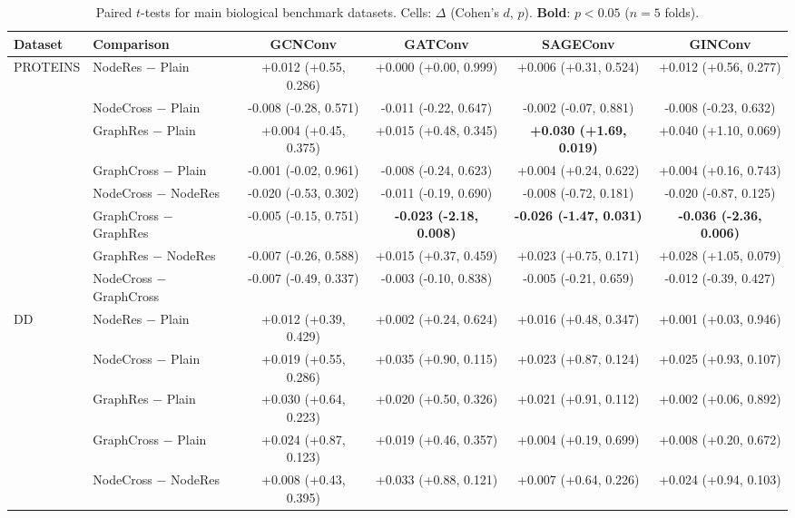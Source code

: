 \begin{table}[t]
\centering
\scriptsize
\setlength{\tabcolsep}{3pt}
\caption{Paired $t$-tests for main biological benchmark datasets. Cells: $\Delta$ (Cohen's $d$, $p$). \textbf{Bold}: $p<0.05$ ($n{=}5$ folds).}
\label{tab:statistical_tests_main}
\begin{tabular}{llcccc}
\toprule
Dataset & Comparison & GCNConv & GATConv & SAGEConv & GINConv \\
\midrule
PROTEINS & NodeRes $-$ Plain & +0.012 (+0.55, 0.286) & +0.000 (+0.00, 0.999) & +0.006 (+0.31, 0.524) & +0.012 (+0.56, 0.277) \\
 & NodeCross $-$ Plain & -0.008 (-0.28, 0.571) & -0.011 (-0.22, 0.647) & -0.002 (-0.07, 0.881) & -0.008 (-0.23, 0.632) \\
 & GraphRes $-$ Plain & +0.004 (+0.45, 0.375) & +0.015 (+0.48, 0.345) & \textbf{+0.030 (+1.69, 0.019)} & +0.040 (+1.10, 0.069) \\
 & GraphCross $-$ Plain & -0.001 (-0.02, 0.961) & -0.008 (-0.24, 0.623) & +0.004 (+0.24, 0.622) & +0.004 (+0.16, 0.743) \\
 & NodeCross $-$ NodeRes & -0.020 (-0.53, 0.302) & -0.011 (-0.19, 0.690) & -0.008 (-0.72, 0.181) & -0.020 (-0.87, 0.125) \\
 & GraphCross $-$ GraphRes & -0.005 (-0.15, 0.751) & \textbf{-0.023 (-2.18, 0.008)} & \textbf{-0.026 (-1.47, 0.031)} & \textbf{-0.036 (-2.36, 0.006)} \\
 & GraphRes $-$ NodeRes & -0.007 (-0.26, 0.588) & +0.015 (+0.37, 0.459) & +0.023 (+0.75, 0.171) & +0.028 (+1.05, 0.079) \\
 & NodeCross $-$ GraphCross & -0.007 (-0.49, 0.337) & -0.003 (-0.10, 0.838) & -0.005 (-0.21, 0.659) & -0.012 (-0.39, 0.427) \\
\midrule
DD & NodeRes $-$ Plain & +0.012 (+0.39, 0.429) & +0.002 (+0.24, 0.624) & +0.016 (+0.48, 0.347) & +0.001 (+0.03, 0.946) \\
 & NodeCross $-$ Plain & +0.019 (+0.55, 0.286) & +0.035 (+0.90, 0.115) & +0.023 (+0.87, 0.124) & +0.025 (+0.93, 0.107) \\
 & GraphRes $-$ Plain & +0.030 (+0.64, 0.223) & +0.020 (+0.50, 0.326) & +0.021 (+0.91, 0.112) & +0.002 (+0.06, 0.892) \\
 & GraphCross $-$ Plain & +0.024 (+0.87, 0.123) & +0.019 (+0.46, 0.357) & +0.004 (+0.19, 0.699) & +0.008 (+0.20, 0.672) \\
 & NodeCross $-$ NodeRes & +0.008 (+0.43, 0.395) & +0.033 (+0.88, 0.121) & +0.007 (+0.64, 0.226) & +0.024 (+0.94, 0.103) \\

\end{tabular}
\end{table}

